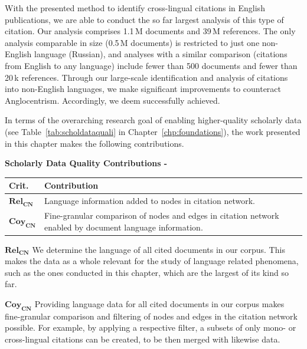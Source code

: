 With the presented method to identify cross-lingual citations in English publications, we are able to conduct the so far largest analysis of this type of citation. Our analysis comprises 1.1\,M documents and 39\,M references. The only analysis comparable in size (0.5\,M documents) is restricted to just one non-English language (Russian), and analyses with a similar comparison (citations from English to any language) include fewer than 500 documents and fewer than 20\,k references. Through our large-scale identification and analysis of citations into non-English languages, we make significant improvements to counteract Anglocentrism. Accordingly, we deem  successfully achieved.

In terms of the overarching research goal of enabling higher-quality scholarly data (see Table~\ref{tab:scholdataquali} in Chapter~\ref{chp:foundations}), the work presented in this chapter makes the following contributions.

\begin{infobox-progress}
      \textbf{Scholarly Data Quality Contributions - \cite{Saier2020xling,Saier2021}}\vspace{0.5em}

      \begin{tabular}{lp{10.9cm}}
        \toprule
        Crit. & Contribution \\
        \midrule
        $\mathbf{Rel_{CN}}$ & Language information added to nodes in citation network. \\
        $\mathbf{Coy_{CN}}$ & Fine-granular comparison of nodes and edges in citation network enabled by document language information. \\
        \bottomrule
      \end{tabular}
\end{infobox-progress}

$\mathbf{Rel_{CN}}$ We determine the language of all cited documents in our corpus. This makes the data as a whole relevant for the study of language related phenomena, such as the ones conducted in this chapter, which are the largest of its kind so far.

$\mathbf{Coy_{CN}}$ Providing language data for all cited documents in our corpus makes fine-granular comparison and filtering of nodes and edges in the citation network possible. For example, by applying a respective filter, a subsets of only mono- or cross-lingual citations can be created, to be then merged with likewise data.
